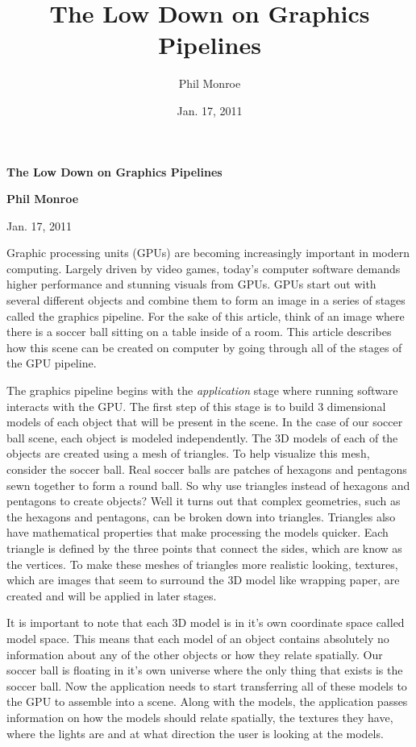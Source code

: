 \documentclass[12pt] {article}
\begin{document}
\title{The Low Down on Graphics Pipelines}
\author{Phil Monroe}
\date{Jan. 17, 2011}

\centerline{
	\Large \bf The Low Down on Graphics Pipelines} %


\centerline{\bf Phil Monroe}

\centerline{Jan. 17, 2011}

\bigskip

Graphic processing units (GPUs) are becoming increasingly important in modern computing. Largely driven by video games, today's computer software  demands higher performance and stunning visuals from GPUs. GPUs start out with several different objects and combine them to form an image in a series of stages called the graphics pipeline. For the sake of this article, think of an image where there is a soccer ball sitting on a table inside of a room. This article describes how this scene can be created on computer by going through all of the stages of the GPU pipeline.

The graphics pipeline begins with the \emph{application} stage where running software interacts with the GPU. The first step of this stage is to build 3 dimensional models of each object that will be present in the scene. In the case of our soccer ball scene, each object is modeled independently. The 3D models of each of the objects are created using a mesh of triangles. To help visualize this mesh, consider the soccer ball. Real soccer balls are patches of hexagons and pentagons sewn together to form a round ball. So why use triangles instead of hexagons and pentagons to create objects? Well it turns out that complex geometries, such as the hexagons and pentagons, can be broken down into triangles. Triangles also have mathematical properties that make processing the models quicker. Each triangle is defined by the three points that connect the sides, which are know as the vertices. To make these meshes of triangles more realistic looking, textures, which are images that seem to surround the 3D model like wrapping paper, are created and will be applied in later stages.

It is important to note that each 3D model is in it's own coordinate space called model space. This means that each model of an object contains absolutely no information about any of the other objects or how they relate spatially. Our soccer ball is floating in it's own universe where the only thing that exists is the soccer ball. Now the application needs to start transferring all of these models to the GPU to assemble into a scene. Along with the models, the application passes information on how the models should relate spatially, the textures they have, where the lights are and at what direction the user is looking at the models.
\end{document}
